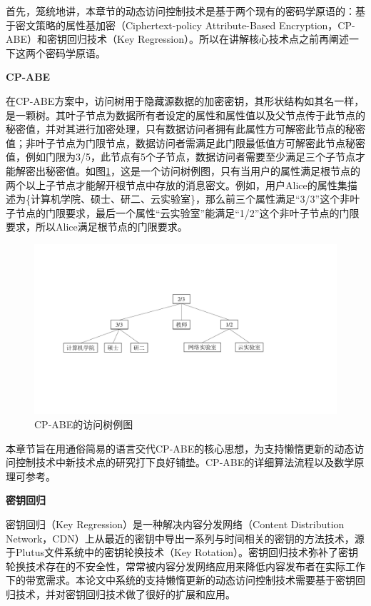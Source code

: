 \documentclass[promaster]{thesis-uestc}
\begin{document}
首先，笼统地讲，本章节的动态访问控制技术是基于两个现有的密码学原语的：基于密文策略的属性基加密（Ciphertext-policy Attribute-Based Encryption，CP-ABE）和密钥回归技术（Key Regression）。所以在讲解核心技术点之前再阐述一下这两个密码学原语。

\textbf{CP-ABE}

在CP-ABE方案中，访问树用于隐藏源数据的加密密钥，其形状结构如其名一样，是一颗树。其叶子节点为数据所有者设定的属性和属性值以及父节点传于此节点的秘密值，并对其进行加密处理，只有数据访问者拥有此属性方可解密此节点的秘密值；非叶子节点为门限节点，数据访问者需满足此门限最低值方可解密此节点秘密值，例如门限为3/5，此节点有5个子节点，数据访问者需要至少满足三个子节点才能解密出秘密值。如图\ref{CP-ABE的访问树例图}，这是一个访问树例图，只有当用户的属性满足根节点的两个以上子节点才能解开根节点中存放的消息密文。例如，用户Alice的属性集描述为\{计算机学院、硕士、研二、云实验室\}，那么前三个属性满足“3/3”这个非叶子节点的门限要求，最后一个属性“云实验室”能满足“1/2”这个非叶子节点的门限要求，所以Alice满足根节点的门限要求。

\begin{figure}[htbp]
    \centering
    \includegraphics[width = 0.9\linewidth]{pic/基于密文策略的属性基加密例图.pdf}
    \caption{CP-ABE的访问树例图}
    \label{CP-ABE的访问树例图}
\end{figure}

本章节旨在用通俗简易的语言交代CP-ABE的核心思想，为支持懒惰更新的动态访问控制技术中新技术点的研究打下良好铺垫。CP-ABE的详细算法流程以及数学原理可参考\cite{bethencourt2007ciphertext}。

\textbf{密钥回归}\label{密钥回归}

密钥回归（Key Regression）是一种解决内容分发网络（Content Distribution Network，CDN）上从最近的密钥中导出一系列与时间相关的密钥的方法技术，源于Plutus文件系统中的密钥轮换技术（Key Rotation）。密钥回归技术弥补了密钥轮换技术存在的不安全性，常常被内容分发网络应用来降低内容发布者在实际工作下的带宽需求。本论文中系统的支持懒惰更新的动态访问控制技术需要基于密钥回归技术，并对密钥回归技术做了很好的扩展和应用。
\end{document}
